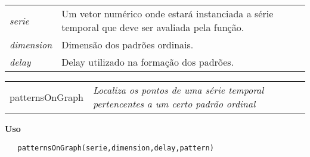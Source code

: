 \begin{table}[!ht]
\begin{center}
\begin{tabularx}{\textwidth}{X X}
\hspace{0.5cm} \textit{serie} \vspace{0.5cm}& Um vetor numérico onde estará instanciada a série temporal que deve ser avaliada pela função.\vspace{0.5cm}\\
\hspace{0.5cm} \textit{dimension} \vspace{0.5cm}& Dimensão dos padrões ordinais.\vspace{0.5cm}\\
\hspace{0.5cm} \textit{delay} \vspace{0.5cm}& Delay utilizado na formação dos padrões.\vspace{0.5cm}\\
\end{tabularx}
\end{center}
\end{table} 

\newpage

\hrulefill   

\begin{table}[!ht]
\begin{center}
\begin{tabularx}{\textwidth}{ X X}
\hspace{0.5cm} patternsOnGraph & \textit{Localiza os pontos de uma série temporal pertencentes a um certo padrão ordinal}
\end{tabularx}
\end{center}
\end{table} 

\vspace{-0.5cm}

\hrulefill  

\vspace{0.5cm}

\textbf{Uso}

\begin{lstlisting}
   patternsOnGraph(serie,dimension,delay,pattern)
\end{lstlisting}

\vspace{0.5cm}

